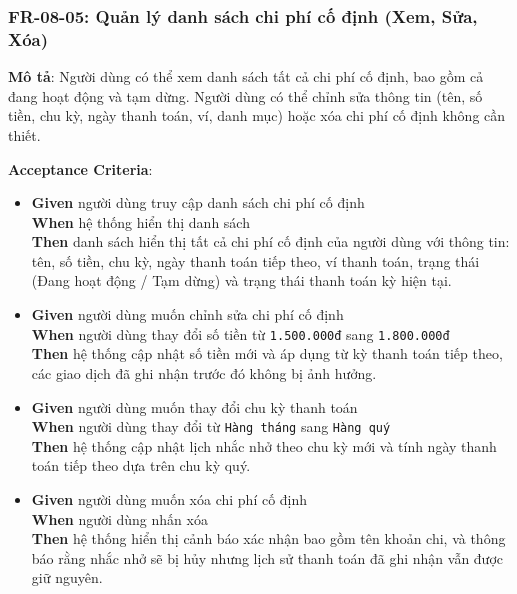 \subsubsection{FR-08-05: Quản lý danh sách chi phí cố định (Xem, Sửa, Xóa)}

\textbf{Mô tả}: Người dùng có thể xem danh sách tất cả chi phí cố định, bao gồm cả đang hoạt động và tạm dừng. Người dùng có thể chỉnh sửa thông tin (tên, số tiền, chu kỳ, ngày thanh toán, ví, danh mục) hoặc xóa chi phí cố định không cần thiết.



\textbf{Acceptance Criteria}:

\begin{itemize}
\item \textbf{Given} người dùng truy cập danh sách chi phí cố định  \\ \hspace*{1.5em}  \textbf{When} hệ thống hiển thị danh sách  \\ \hspace*{1.5em}  \textbf{Then} danh sách hiển thị tất cả chi phí cố định của người dùng với thông tin: tên, số tiền, chu kỳ, ngày thanh toán tiếp theo, ví thanh toán, trạng thái (Đang hoạt động / Tạm dừng) và trạng thái thanh toán kỳ hiện tại.
\item \textbf{Given} người dùng muốn chỉnh sửa chi phí cố định  \\ \hspace*{1.5em}  \textbf{When} người dùng thay đổi số tiền từ \texttt{1.500.000đ} sang \texttt{1.800.000đ}  \\ \hspace*{1.5em}  \textbf{Then} hệ thống cập nhật số tiền mới và áp dụng từ kỳ thanh toán tiếp theo, các giao dịch đã ghi nhận trước đó không bị ảnh hưởng.
\item \textbf{Given} người dùng muốn thay đổi chu kỳ thanh toán  \\ \hspace*{1.5em}  \textbf{When} người dùng thay đổi từ \texttt{Hàng tháng} sang \texttt{Hàng quý}  \\ \hspace*{1.5em}  \textbf{Then} hệ thống cập nhật lịch nhắc nhở theo chu kỳ mới và tính ngày thanh toán tiếp theo dựa trên chu kỳ quý.
\item \textbf{Given} người dùng muốn xóa chi phí cố định  \\ \hspace*{1.5em}  \textbf{When} người dùng nhấn xóa  \\ \hspace*{1.5em}  \textbf{Then} hệ thống hiển thị cảnh báo xác nhận bao gồm tên khoản chi, và thông báo rằng nhắc nhở sẽ bị hủy nhưng lịch sử thanh toán đã ghi nhận vẫn được giữ nguyên.

\end{itemize}
